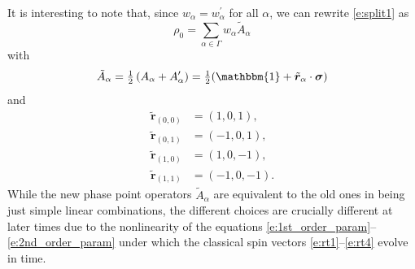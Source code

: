 \documentclass[aps,prl,showpacs,amsmath,amssymb,superscriptaddress,reprint,10pt]{revtex4-1}
\newcommand\id{{\mathbbm{1}}}
\newcommand{\mvec}[1]{\boldsymbol #1}
\begin{document}
\begin{bibunit}
It is interesting to note that, since $w_\alpha=w_\alpha^\prime$ for all $\alpha$, we can rewrite \eqref{e:split1} as
\begin{equation}\label{e:split2}
\rho_0 = \sum_{\alpha\in\Gamma}w_\alpha \tilde{A}_\alpha
\end{equation}
with
\begin{equation}
\tilde{A}_\alpha = \tfrac{1}{2}\left(A_\alpha + A_\alpha^\prime\right) = \tfrac{1}{2}(\id+\tilde{\mvec{r}}_\alpha\cdot\mvec{\sigma})
\end{equation}
and
\begin{subequations}
\begin{align}
\tilde{\mvec{r}}_{(0,0)}&=(1,0,1),\label{e:rt1}\\
\tilde{\mvec{r}}_{(0,1)}&=(-1,0,1),\\
\tilde{\mvec{r}}_{(1,0)}&=(1,0,-1),\\
\tilde{\mvec{r}}_{(1,1)}&=(-1,0,-1).\label{e:rt4}
\end{align}
\end{subequations}
While the new phase point operators $\tilde{A}_\alpha$ are equivalent to the old ones in being just simple linear combinations, the different choices are crucially different at later times due to the nonlinearity of the equations \eqref{e:1st_order_param}--\eqref{e:2nd_order_param} under which the classical spin vectors \eqref{e:rt1}--\eqref{e:rt4} evolve in time.


\end{bibunit}
\end{document}
